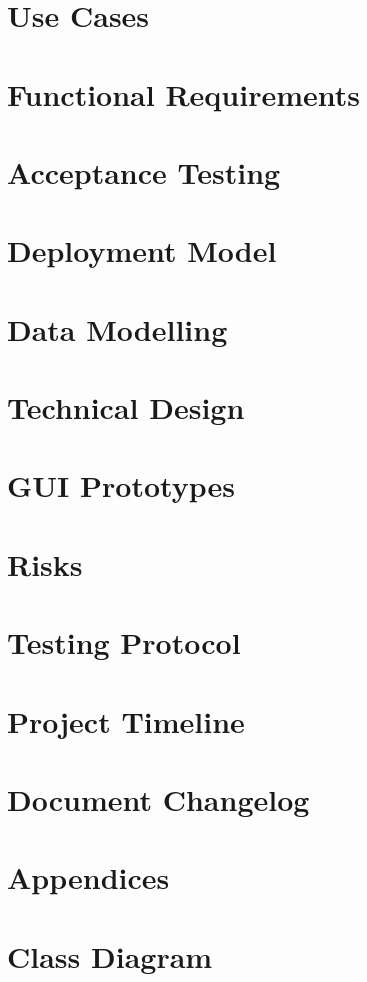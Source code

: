 \documentclass{article}
\begin{document}
	\section{Use Cases}
	
	\pagebreak
	
	\section{Functional Requirements}
	
	\pagebreak
	
	\section{Acceptance Testing}
	
	\pagebreak
	
	\section{Deployment Model}
	
	\pagebreak
	
	\section{Data Modelling}
	
	\pagebreak
	
	\section{Technical Design}
	
	\pagebreak
	
	\section{GUI Prototypes}
	
	\pagebreak
	
	\section{Risks}
	
	\pagebreak
	
	\section{Testing Protocol}
	
	\pagebreak
	
	\section{Project Timeline}
	
	\pagebreak
	
	\section{Document Changelog}
	
	\pagebreak
	
	\appendix
	\section*{Appendices}
	\section{Class Diagram}
\end{document}
